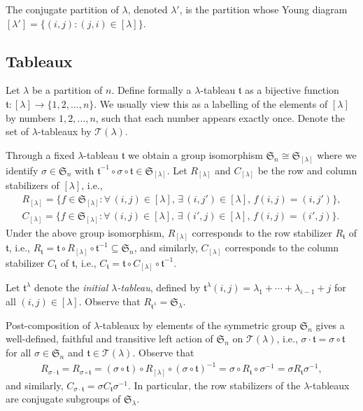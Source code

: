 \documentclass[pdftex]{sigma}
\renewcommand{\t}{\mathfrak{t}}
\newcommand{\TT}{\mathscr{T}}
\newcommand{\sym}[1]{\mathfrak{S}_{#1}}
\begin{document}
The conjugate partition of $\lambda$, denoted $\lambda'$, is the partition whose Young diagram $[\lambda'] = \{ (i,j)\colon (j,i) \in [\lambda] \}$.

\subsection{Tableaux} \label{SS:Tableaux}

Let $\lambda$ be a partition of $n$. Define formally a $\lambda$-tableau $\t$ as a bijective function $\t\colon [\lambda] \to \{1,2,\dotsc,n \}$. We usually view this as a labelling of the elements of $[\lambda]$ by numbers $1,2,\dotsc,n$, such that each number appears exactly once. Denote the set of $\lambda$-tableaux by $\TT(\lambda)$.

Through a fixed $\lambda$-tableau $\t$ we obtain a group isomorphism $\sym{n} \cong \sym{[\lambda]}$ where we identify $\sigma\in\sym{n}$ with $\t^{-1} \circ \sigma \circ \t\in \sym{[\lambda]}$. Let $R_{[\lambda]}$ and $C_{[\lambda]}$ be the row and column stabilizers of $[\lambda]$, i.e.,
\begin{gather*}
R_{[\lambda]}= \{ f \in \sym{[\lambda]}\colon \forall\, (i, j) \in [\lambda],\, \exists\, (i,j')\in [\lambda],\, f(i,j) = (i,j') \}, \\
C_{[\lambda]}= \{ f \in \sym{[\lambda]}\colon \forall\, (i, j) \in [\lambda],\, \exists\, (i',j)\in [\lambda],\, f(i,j) = (i',j) \}.
\end{gather*}
Under the above group isomorphism, $R_{[\lambda]}$ corresponds to the row stabilizer $R_{\t}$ of $\t$, i.e., $R_{\t} = \t \circ R_{[\lambda]} \circ \t^{-1} \subseteq \sym{n}$, and similarly, $C_{[\lambda]}$ corresponds to the column stabilizer $C_{\t}$ of $\t$, i.e., $C_{\t}=\t\circ C_{[\lambda]}\circ \t^{-1}$.

Let $\t^{\lambda}$ denote the \textit{initial $\lambda$-tableau}, defined by $\t^{\lambda}(i,j) = \lambda_1 + \dotsb + \lambda_{i-1} + j$ for all $(i,j) \in [\lambda]$. Observe that $R_{\t^{\lambda}} = \sym{\lambda}$.

Post-composition of $\lambda$-tableaux by elements of the symmetric group $\sym{n}$ gives a well-defined, faithful and transitive left action of $\sym{n}$ on $\TT(\lambda)$, i.e., $\sigma \cdot \t = \sigma \circ \t$ for all $\sigma \in \sym{n}$ and $\t \in \TT(\lambda)$. Observe that \begin{gather*}R_{\sigma \cdot \t} = R_{\sigma \circ \t} = (\sigma \circ \t) \circ R_{[\lambda]} \circ (\sigma \circ \t)^{-1} = \sigma \circ R_{\t} \circ \sigma^{-1} = \sigma R_{\t} \sigma^{-1},\end{gather*} and similarly, $C_{\sigma \cdot \t} = \sigma C_{\t} \sigma^{-1}$. In particular, the row stabilizers of the $\lambda$-tableaux are conjugate subgroups of $\sym{\lambda}$.
\end{document}
